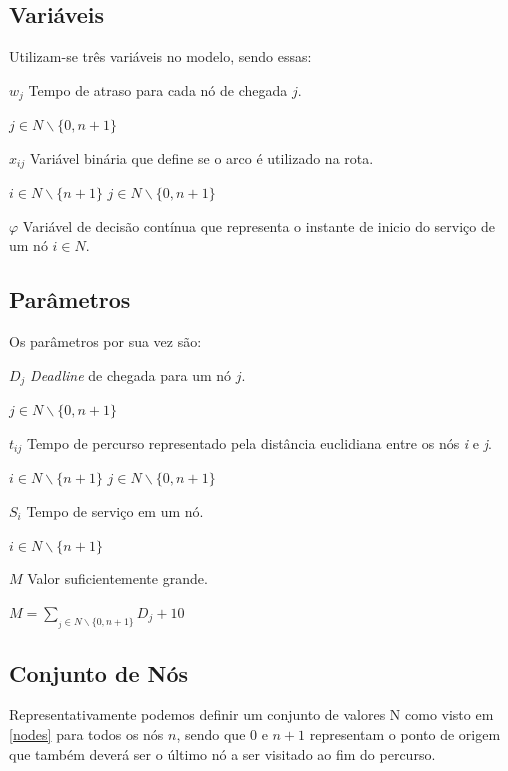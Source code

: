 \documentclass[12pt]{article}
\begin{document}
\subsection{Variáveis}

Utilizam-se três variáveis no modelo, sendo essas:

$w_j$ Tempo de atraso para cada nó de chegada $j$.

\hspace{1.27cm} $j\in N\backslash \{0,n+1\}$

$x_{ij}$ Variável binária que define se o arco é utilizado na rota.

\hspace{1.27cm} $i\in N\backslash \{n+1\}$ \hspace{1.27cm}  $j\in N\backslash \{0,n+1\}$

$\varphi$ Variável de decisão contínua que representa o instante de inicio do serviço de um nó $i\in N$.


\subsection{Parâmetros}

Os parâmetros por sua vez são:

$D_j$ {\it Deadline} de chegada para um nó $j$.

\hspace{1.27cm} $j\in N\backslash \{0,n+1\}$

$t_{ij}$ Tempo de percurso representado pela distância euclidiana entre os nós {\it i} e {\it j}.

\hspace{1.27cm} $i\in N\backslash \{n+1\}$ \hspace{1.27cm}  $j\in N\backslash \{0,n+1\}$

$S_i$ Tempo de serviço em um nó.

\hspace{1.27cm} $i\in N\backslash \{n+1\}$

$M$ Valor suficientemente grande.

\hspace{1.27cm} $M = \sum_{_j\in N\backslash \{0,n+1\}}  D_j + 10$


\subsection{Conjunto de Nós}

Representativamente podemos definir um conjunto de valores N como visto em \eqref{nodes} para todos os nós $n$, sendo que 0 e $n+1$ representam o ponto de origem que também deverá ser o último nó a ser visitado ao fim do percurso.
\end{document}
